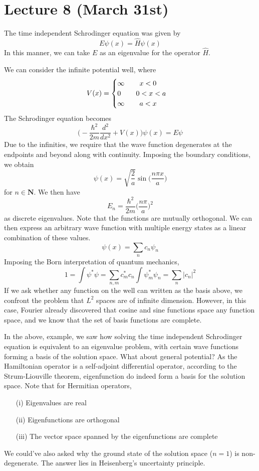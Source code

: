 \section{Lecture 8 (March 31st)}
\begin{recall}
The time independent Schrodinger equation was given by
\[E\psi  (x)=\hat{H}\psi  (x)\]
In this manner, we can take $E$ as an eigenvalue for the operator $\hat{H}$. 
\end{recall}
\vspace{2ex}
\begin{ex}
We can consider the infinite potential well, where
\[V(x)=\begin{cases}
\infty \hspace{5ex}x<0\\
0\hspace{5ex}0<x<a\\
\infty \hspace{5ex}a<x
\end{cases}\]
The Schrodinger equation becomes
\[\Big(-\dfrac{\hbar^2}{2m}\dfrac{d ^2}{d x^2}+V(x)\Big)\psi (x)=E\psi  \]
Due to the infinities, we require that the wave function degenerates at the endpoints and beyond along with continuity. Imposing the boundary conditions, we obtain
\[\psi (x)=\sqrt{\dfrac{2}{a}}\sin \Big(\dfrac{n\pi x}{a}\Big)\]
for $n\in {\bm N}$. We then have 
\[E_{n}=\dfrac{\hbar ^2}{2m}\Big(\dfrac{n\pi }{a}\Big)^2\]
as discrete eigenvalues. Note that the functions are mutually orthogonal. We can then express an arbitrary wave function with multiple energy states as a linear combination of these values.
\[\psi  (x)=\sum _{n}c_{n}\psi  _{n} \]
Imposing the Born interpretation of quantum mechanics,
\[1=\int \psi ^{*}\psi =\sum _{n,m}c_{m}^{*}c_{n}\int \psi _{m}^{*}\psi _{n}=\sum _{n}|c_{n}|^2\]
If we ask whether any function on the well can written as the basis above, we confront the problem that $L^2$ spaces are of infinite dimension. However, in this case, Fourier already discovered that cosine and sine functions space any function space, and we know that the set of basis functions are complete.
\end{ex}
\vspace{2ex}
\begin{rmk}
In the above, example, we saw how solving the time independent Schrodinger equation is equivalent to an eigenvalue problem, with certain wave functions forming a basis of the solution space. What about general potential? As the Hamiltonian operator is a self-adjoint differential operator, according to the Strum-Liouville theorem, eigenfunction do indeed form a basis for the solution space. Note that for Hermitian operators,
\begin{itemize}
\item[(i)] Eigenvalues are real
\item[(ii)] Eigenfunctions are orthogonal
\item[(iii)] The vector space spanned by the eigenfunctions are complete
\end{itemize}
We could've also asked why the ground state of the solution space ($n=1$) is non-degenerate. The answer lies in Heisenberg's uncertainty principle. 
\end{rmk}
\vspace{2ex}

